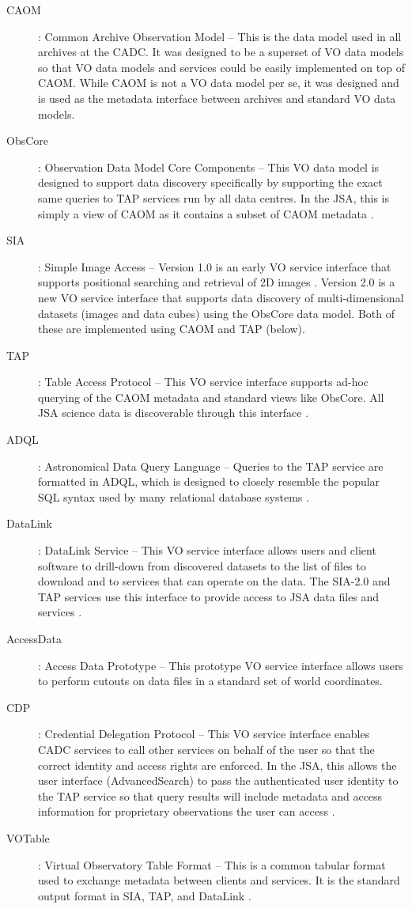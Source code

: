 \documentclass[final,authoryear,5p,times,twocolumn]{elsarticle}
\begin{document}
\begin{description}
\item[CAOM] : Common Archive Observation Model -- This is the data model
used in all archives at the CADC. It was designed to be a superset
of VO data models so that VO data models and services could be easily
implemented on top of CAOM. While CAOM is not a VO data model per se,
it was designed and is used as the metadata interface between archives
and standard VO data models. \citep{2007ASPC..376..347D,2013ASPC..475..159R}
\item[ObsCore] : Observation Data Model Core Components -- This VO data model
is designed to support data discovery specifically by supporting the
exact same queries to TAP services run by all data centres. In the JSA,
this is simply a view of CAOM as it contains a subset of CAOM metadata \citep{obscore}.
\item[SIA] : Simple Image Access -- Version 1.0 is an early VO service
interface that supports positional searching and retrieval of 2D
images \citep{siap}.
Version 2.0 \citep{siav2} is a new VO service interface that supports data discovery
of multi-dimensional datasets (images and data cubes) using the ObsCore
data model. Both of these are implemented using CAOM and TAP (below).
\item[TAP] : Table Access Protocol -- This VO service interface supports ad-hoc
querying of the CAOM metadata and standard views like ObsCore. All JSA
science data is discoverable through this interface \citep{tap,2014NandrekarHeinis201437}.
\item[ADQL] : Astronomical Data Query Language -- Queries to the TAP service
are formatted in ADQL, which is designed to closely resemble the popular SQL
syntax used by many relational database systems \citep{adql}.
\item[DataLink] : DataLink Service -- This VO service interface allows users
and client software to drill-down from discovered datasets to the list
of files to download and to services that can operate on the data. The
SIA-2.0 and TAP services use this interface to provide access to JSA
data files and services \citep{datalink}.
\item[AccessData] : Access Data Prototype -- This prototype VO service interface
allows users to perform cutouts on data files in a standard set of
world coordinates.
\item[CDP] : Credential Delegation Protocol -- This VO service interface enables
CADC services to call other services on behalf of the user so that the
correct identity and access rights are enforced. In the JSA, this allows
the user interface (AdvancedSearch) to pass the authenticated user
identity to the TAP service so that query results will include metadata
and access information for proprietary observations the user can access \citep{cdp}.
\item[VOTable] : Virtual Observatory Table Format -- This is a common tabular
format used to exchange metadata between clients and services. It is
the standard output format in SIA, TAP, and DataLink \citep{votable}.
\end{description}
\end{document}
